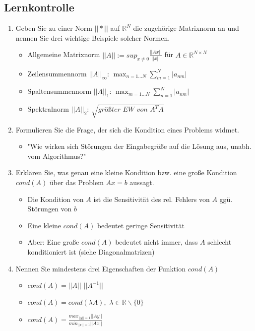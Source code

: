 \documentclass[]{article}
\begin{document}
\subsection{Lernkontrolle}
	\begin{enumerate}
		\item Geben Sie zu einer Norm $|| * ||$ auf $\mathbb{R}^N$ die zugehörige Matrixnorm an und nennen Sie drei wichtige Beispiele solcher Normen.
			\begin{itemize}
				\item Allgemeine Matrixnorm $||A|| := sup_{x \neq 0} \frac{||Ax||}{||x||}$ für $A \in \mathbb{R}^{N \times N}$
				\item Zeilensummennorm $||A||_\infty$: $\max_{n=1 \dots N} \sum_{m=1}^{N}|a_{nm}|$
				\item Spaltensummennorm $||A||_1$: $\max_{m=1 \dots N} \sum_{n=1}^{N}|a_{nm}|$
				\item Spektralnorm $||A||_2$: $\sqrt{\textit{größter EW von }A^T A}$
			\end{itemize}
		\item Formulieren Sie die Frage, der sich die Kondition eines Problems widmet.
			\begin{itemize}
				\item "Wie wirken sich Störungen der Eingabegröße auf die Lösung aus, unabh. vom Algorithmus?"
			\end{itemize}
		\item Erklären Sie, was genau eine kleine Kondition bzw. eine große Kondition $cond(A)$ über das Problem $Ax=b$ aussagt.
			\begin{itemize}
				\item Die Kondition von $A$ ist die Sensitivität des rel. Fehlers von $A$ ggü. Störungen von $b$
				\item Eine kleine $cond(A)$ bedeutet geringe Sensitivität
                \item Aber: Eine große $cond(A)$ bedeutet nicht immer, dass $A$ schlecht konditioniert ist (siehe Diagonalmatrizen)
			\end{itemize}
		\item Nennen Sie mindestens drei Eigenschaften der Funktion $cond(A)$
			\begin{itemize}
				\item $cond(A) = ||A||$ $||A^{-1}||$
				\item $cond(A) = cond(\lambda A),$ \quad $\lambda \in \mathbb{R} \backslash \{0\}$
				\item $cond(A) = \frac{max_{||y||=1}  ||Ay||}{min_{||x||=1} ||Ax||}$

\end{itemize}
\end{enumerate}
\end{document}
